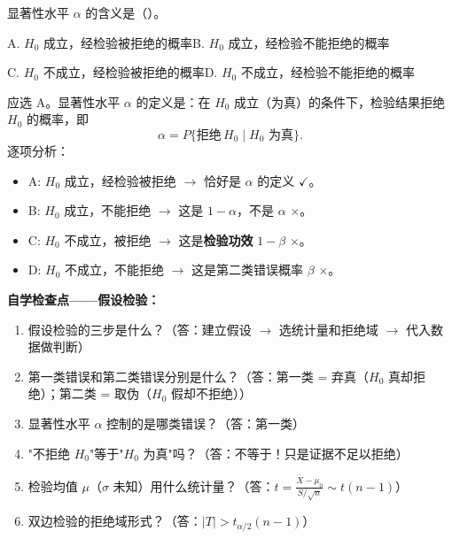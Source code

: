 ﻿\documentclass[lang=cn,11pt]{elegantbook}
\begin{document}
\begin{exercise}\label{exer:9-error-concept2}
显著性水平 \(\alpha\) 的含义是（\quad）。\par
A. \(H_0\) 成立，经检验被拒绝的概率\qquad B. \(H_0\) 成立，经检验不能拒绝的概率\par
C. \(H_0\) 不成立，经检验被拒绝的概率\qquad D. \(H_0\) 不成立，经检验不能拒绝的概率
\end{exercise}
\begin{solution}
应选 A。显著性水平 \(\alpha\) 的定义是：在 \(H_0\) 成立（为真）的条件下，检验结果拒绝 \(H_0\) 的概率，即
\[
\alpha = P\{\text{拒绝}\,H_0 \mid H_0\text{ 为真}\}.
\]
逐项分析：
\begin{itemize}
    \item A: \(H_0\) 成立，经检验被拒绝 \(\longrightarrow\) 恰好是 \(\alpha\) 的定义 \(\checkmark\)。
    \item B: \(H_0\) 成立，不能拒绝 \(\longrightarrow\) 这是 \(1-\alpha\)，不是 \(\alpha\) \(\times\)。
    \item C: \(H_0\) 不成立，被拒绝 \(\longrightarrow\) 这是\textbf{检验功效} \(1-\beta\) \(\times\)。
    \item D: \(H_0\) 不成立，不能拒绝 \(\longrightarrow\) 这是第二类错误概率 \(\beta\) \(\times\)。
\end{itemize}
\end{solution}

\begin{note}
\textbf{自学检查点——假设检验：}
\begin{enumerate}
    \item 假设检验的三步是什么？（答：建立假设 $\to$ 选统计量和拒绝域 $\to$ 代入数据做判断）
    \item 第一类错误和第二类错误分别是什么？（答：第一类 = 弃真（$H_0$ 真却拒绝）；第二类 = 取伪（$H_0$ 假却不拒绝））
    \item 显著性水平 $\alpha$ 控制的是哪类错误？（答：第一类）
    \item "不拒绝 $H_0$"等于"$H_0$ 为真"吗？（答：不等于！只是证据不足以拒绝）
    \item 检验均值 $\mu$（$\sigma$ 未知）用什么统计量？（答：$t=\frac{\bar{X}-\mu_0}{S/\sqrt{n}}\sim t(n-1)$）
    \item 双边检验的拒绝域形式？（答：$|T|>t_{\alpha/2}(n-1)$）
\end{enumerate}
\end{note}
\end{document}
